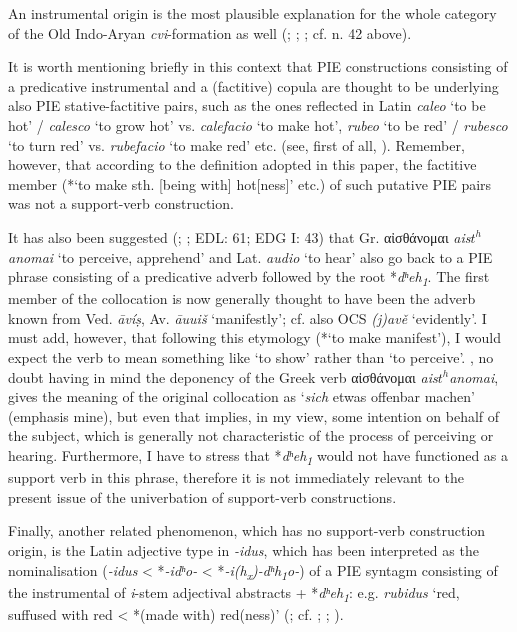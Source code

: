 \documentclass[output=paper,colorlinks,citecolor=brown]{langscibook}
\begin{document}
An instrumental origin is the most plausible explanation for the whole category of the Old Indo-Aryan \textit{cvi}-formation as well (\citealt[391--393]{Schindler1980}; \citealt[190--191]{Widmer2005}; \citealt[passim, esp. 287--292]{Balles2006}; cf. n. 42 above).

It is worth mentioning briefly in this context that PIE constructions consisting of a predicative instrumental and a (factitive) copula are thought to be underlying also PIE stative-factitive pairs, such as the ones reflected in Latin \textit{caleo} ‘to be hot’ / \textit{calesco} ‘to grow hot’ vs. \textit{calefacio} ‘to make hot’, \textit{rubeo} ‘to be red’ / \textit{rubesco} ‘to turn red’ vs. \textit{rubefacio} ‘to make red’ etc. (see, first of all, \citealt{Jasanoff2002-2003}). Remember, however, that according to the definition adopted in this paper, the factitive member (*‘to make sth. [being with] hot[ness]’ etc.) of such putative PIE pairs was not a support-verb construction.

It has also been suggested (\citealt{MeierBrügger1980}; \citealt[475 n. 38]{Bader1986}; EDL: 61; EDG I: 43) that Gr. αἰσθάνομαι \textit{ais$t^h$anomai} ‘to perceive, apprehend’ and Lat. \textit{audio} ‘to hear’ also go back to a PIE phrase consisting of a predicative adverb followed by the root *\textit{dʰeh\textsubscript{1}}. The first member of the collocation is now generally thought to have been the adverb known from Ved. \textit{āvíṣ}, Av. \textit{āuuiš} ‘manifestly’; cf. also OCS \textit{(j)avě} ‘evidently’. I must add, however, that following this etymology (*‘to make manifest’), I would expect the verb to mean something like ‘to show’ rather than ‘to perceive’. \citet[290]{MeierBrügger1980}, no doubt having in mind the deponency of the Greek verb αἰσθάνομαι \textit{ais$t^h$anomai}, gives the meaning of the original collocation as `\textit{sich} etwas offenbar machen' (emphasis mine), but even that implies, in my view, some intention on behalf of the subject, which is generally not characteristic of the process of perceiving or hearing. Furthermore, I have to stress that *\textit{dʰeh\textsubscript{1}} would not have functioned as a support verb in this phrase, therefore it is not immediately relevant to the present issue of the univerbation of support-verb constructions.

Finally, another related phenomenon, which has no support-verb construction origin, is the Latin adjective type in \textit{-idus}, which has been interpreted as the nominalisation (\textit{-idus} < *\textit{-idʰo-} < *\textit{-i(h\textsubscript{x})-dʰh\textsubscript{1}o-}) of a PIE syntagm consisting of the instrumental of \textit{i}-stem adjectival abstracts + *\textit{dʰeh\textsubscript{1}}: e.g. \textit{rubidus} ‘red, suffused with red < *(made with) red(ness)’ (\citealt[222--225]{Balles2006}; cf. \citealt{Nussbaum1999}; \citealt[13--14, 16--17]{Hackstein2002b}; \citealt{Balles2003}).
\end{document}
